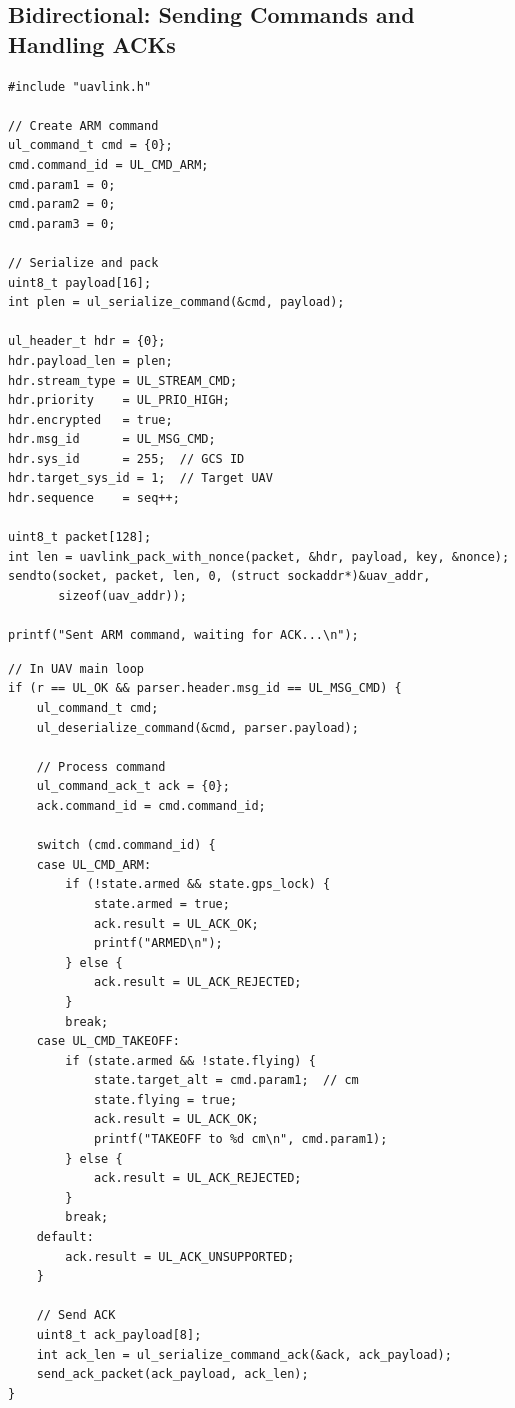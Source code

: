 \documentclass[11pt,a4paper]{article}
\begin{document}
\subsection{Bidirectional: Sending Commands and Handling ACKs}

\begin{lstlisting}[caption={GCS: Send ARM command and wait for ACK}]
#include "uavlink.h"

// Create ARM command
ul_command_t cmd = {0};
cmd.command_id = UL_CMD_ARM;
cmd.param1 = 0;
cmd.param2 = 0;
cmd.param3 = 0;

// Serialize and pack
uint8_t payload[16];
int plen = ul_serialize_command(&cmd, payload);

ul_header_t hdr = {0};
hdr.payload_len = plen;
hdr.stream_type = UL_STREAM_CMD;
hdr.priority    = UL_PRIO_HIGH;
hdr.encrypted   = true;
hdr.msg_id      = UL_MSG_CMD;
hdr.sys_id      = 255;  // GCS ID
hdr.target_sys_id = 1;  // Target UAV
hdr.sequence    = seq++;

uint8_t packet[128];
int len = uavlink_pack_with_nonce(packet, &hdr, payload, key, &nonce);
sendto(socket, packet, len, 0, (struct sockaddr*)&uav_addr, 
       sizeof(uav_addr));

printf("Sent ARM command, waiting for ACK...\n");
\end{lstlisting}

\begin{lstlisting}[caption={UAV: Process command and send ACK}]
// In UAV main loop
if (r == UL_OK && parser.header.msg_id == UL_MSG_CMD) {
    ul_command_t cmd;
    ul_deserialize_command(&cmd, parser.payload);
    
    // Process command
    ul_command_ack_t ack = {0};
    ack.command_id = cmd.command_id;
    
    switch (cmd.command_id) {
    case UL_CMD_ARM:
        if (!state.armed && state.gps_lock) {
            state.armed = true;
            ack.result = UL_ACK_OK;
            printf("ARMED\n");
        } else {
            ack.result = UL_ACK_REJECTED;
        }
        break;
    case UL_CMD_TAKEOFF:
        if (state.armed && !state.flying) {
            state.target_alt = cmd.param1;  // cm
            state.flying = true;
            ack.result = UL_ACK_OK;
            printf("TAKEOFF to %d cm\n", cmd.param1);
        } else {
            ack.result = UL_ACK_REJECTED;
        }
        break;
    default:
        ack.result = UL_ACK_UNSUPPORTED;
    }
    
    // Send ACK
    uint8_t ack_payload[8];
    int ack_len = ul_serialize_command_ack(&ack, ack_payload);
    send_ack_packet(ack_payload, ack_len);
}
\end{lstlisting}
\end{document}
